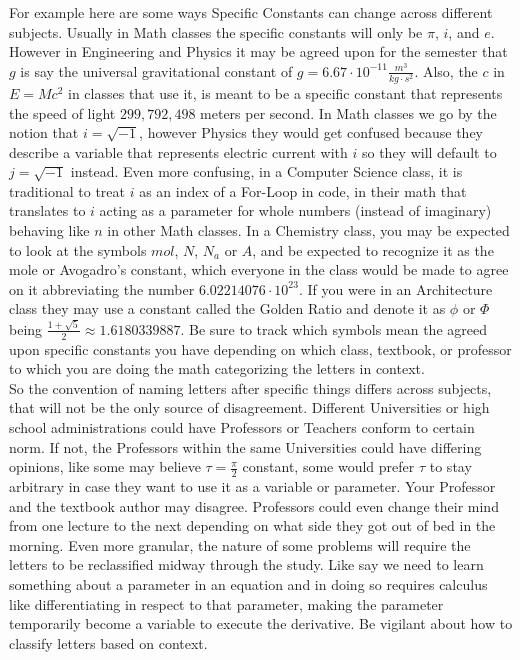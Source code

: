 \documentclass[12pt]{article}
\begin{document}
For example here are some ways Specific Constants can change across different subjects. Usually in Math classes the specific constants will only be $\pi$, $i$, and $e$. However in Engineering and Physics it may be agreed upon for the semester that $g$ is say the universal gravitational constant of $g=6.67\cdot 10^{-11} \frac{m^3}{kg \cdot s^2}$. Also, the $c$ in $E=Mc^2$ in classes that use it, is meant to be a specific constant that represents the speed of light $299,792,498$ meters per second. In Math classes we go by the notion that $i=\sqrt{-1}$, however Physics they would get confused because they describe a variable that represents electric current with $i$ so they will default to $j=\sqrt{-1}$ instead. Even more confusing, in a Computer Science class, it is traditional to treat $i$ as an index of a For-Loop in code, in their math that translates to $i$ acting as a parameter for whole numbers (instead of imaginary) behaving like $n$ in other Math classes. In a Chemistry class, you may be expected to look at the symbols $mol$, $N$, $N_a$ or $A$, and be expected to recognize it as the mole or Avogadro's constant, which everyone in the class would be made to agree on it abbreviating the number $6.02214076\cdot10^{23}$. If you were in an Architecture class they may use a constant called the Golden Ratio and denote it as $\phi$ or $\Phi$ being $\frac{1+\sqrt{5}}{2}\approx1.6180339887$. Be sure to track which symbols mean the agreed upon specific constants you have depending on which class, textbook, or professor to which you are doing the math categorizing the letters in context. \\

So the convention of naming letters after specific things differs across subjects, that will not be the only source of disagreement. Different Universities or high school administrations could have Professors or Teachers conform to certain norm. If not, the Professors within the same Universities could have differing opinions, like some may believe $\tau=\frac{\pi}{2}$ constant, some would prefer $\tau$ to stay arbitrary in case they want to use it as a variable or parameter. Your Professor and the textbook author may disagree. Professors could even change their mind from one lecture to the next depending on what side they got out of bed in the morning. Even more granular, the nature of some problems will require the letters to be reclassified midway through the study. Like say we need to learn something about a parameter in an equation and in doing so requires calculus like differentiating in respect to that parameter, making the parameter temporarily become a variable to execute the derivative. Be vigilant about how to classify letters based on context. \\
\end{document}
